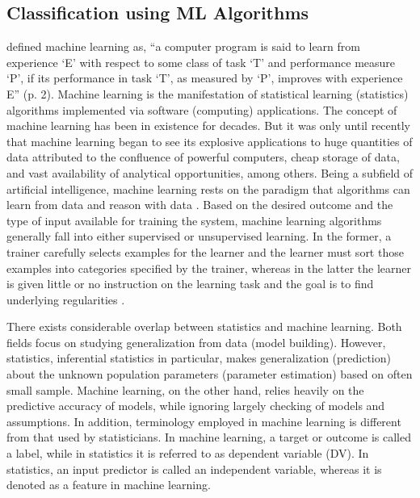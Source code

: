 \documentclass[deca,nonblindrev]{informs3} %
\begin{document}
\subsection{Classification using ML Algorithms}

\cite{mitchell1997machine}  defined machine learning as, ``a  computer program is said to learn from experience ‘E’ with respect to some class of task ‘T’ and performance measure ‘P’, if its performance in task ‘T’, as measured by ‘P’, improves with experience E'' (p. 2). Machine learning is the manifestation of statistical learning (statistics) algorithms implemented via software (computing) applications. The concept of machine learning has been in existence for decades. But it was only until recently that machine learning began to see its explosive applications to huge quantities of data attributed to the confluence of powerful computers, cheap storage of data, and vast availability of analytical opportunities, among others. Being a subfield of artificial intelligence, machine learning rests on the paradigm that algorithms can learn from data and reason with data \citep{rao2013handbook}. Based on the desired outcome and the type of input available for training the system, machine learning algorithms generally fall into either supervised or unsupervised learning.  In the former, a trainer carefully selects examples for the learner and the learner must sort those examples into categories specified by the trainer, whereas in the latter the learner is given little or no instruction on the learning task and the goal is to find underlying regularities \citep{cottrell2006new}.

There exists considerable overlap between statistics and machine learning. Both fields focus on studying generalization from data (model building). However, statistics, inferential statistics in particular, makes generalization (prediction) about the unknown population parameters (parameter estimation) based on often small sample. Machine learning, on the other hand, relies heavily on the predictive accuracy of models, while ignoring largely checking of models and assumptions. In addition, terminology employed in machine learning is different from that used by statisticians. In machine learning, a target or outcome is called a label, while in statistics it is referred to as dependent variable (DV). In statistics, an input predictor is called an independent variable, whereas it is denoted as a feature in machine learning.  
\end{document}

